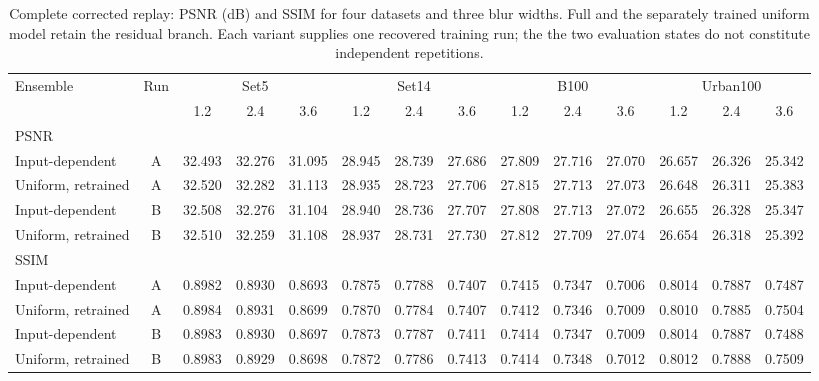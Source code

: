 \begin{table}[t]
\caption{Complete corrected replay: PSNR (dB) and SSIM for four datasets and three blur widths. Full and the separately trained uniform model retain the residual branch. Each variant supplies one recovered training run; the the two evaluation states do not constitute independent repetitions.}
\centering\footnotesize
\setlength{\tabcolsep}{2.2pt}
\begin{tabular}{lc|ccc|ccc|ccc|ccc}
\toprule
Ensemble & Run & \multicolumn{3}{c|}{Set5} & \multicolumn{3}{c|}{Set14} & \multicolumn{3}{c|}{B100} & \multicolumn{3}{c}{Urban100}\\
& &1.2&2.4&3.6&1.2&2.4&3.6&1.2&2.4&3.6&1.2&2.4&3.6\\
\midrule
\multicolumn{14}{l}{PSNR}\\
Input-dependent & A & 32.493 & 32.276 & 31.095 & 28.945 & 28.739 & 27.686 & 27.809 & 27.716 & 27.070 & 26.657 & 26.326 & 25.342\\
Uniform, retrained & A & 32.520 & 32.282 & 31.113 & 28.935 & 28.723 & 27.706 & 27.815 & 27.713 & 27.073 & 26.648 & 26.311 & 25.383\\
Input-dependent & B & 32.508 & 32.276 & 31.104 & 28.940 & 28.736 & 27.707 & 27.808 & 27.713 & 27.072 & 26.655 & 26.328 & 25.347\\
Uniform, retrained & B & 32.510 & 32.259 & 31.108 & 28.937 & 28.731 & 27.730 & 27.812 & 27.709 & 27.074 & 26.654 & 26.318 & 25.392\\
\midrule
\multicolumn{14}{l}{SSIM}\\
Input-dependent & A & 0.8982 & 0.8930 & 0.8693 & 0.7875 & 0.7788 & 0.7407 & 0.7415 & 0.7347 & 0.7006 & 0.8014 & 0.7887 & 0.7487\\
Uniform, retrained & A & 0.8984 & 0.8931 & 0.8699 & 0.7870 & 0.7784 & 0.7407 & 0.7412 & 0.7346 & 0.7009 & 0.8010 & 0.7885 & 0.7504\\
Input-dependent & B & 0.8983 & 0.8930 & 0.8697 & 0.7873 & 0.7787 & 0.7411 & 0.7414 & 0.7347 & 0.7009 & 0.8014 & 0.7887 & 0.7488\\
Uniform, retrained & B & 0.8983 & 0.8929 & 0.8698 & 0.7872 & 0.7786 & 0.7413 & 0.7414 & 0.7348 & 0.7012 & 0.8012 & 0.7888 & 0.7509\\
\bottomrule
\end{tabular}
\label{tab:supp_uniform_training}
\end{table}
